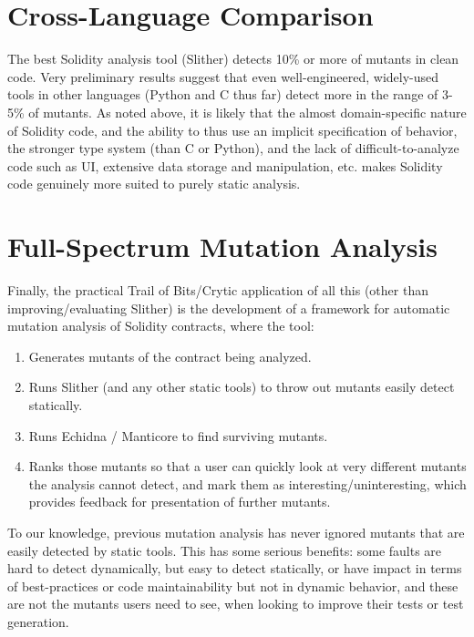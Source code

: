 \documentclass{article}
\begin{document}
\section{Cross-Language Comparison}

The best Solidity analysis tool (Slither) detects 10\% or more of mutants in clean code.   Very preliminary results suggest that even well-engineered, widely-used tools in other languages (Python and C thus far) detect more in the range of 3-5\% of mutants.  As noted above, it is likely that the almost domain-specific nature of Solidity code, and the ability to thus use an implicit specification of behavior, the stronger type system (than C or Python), and the lack of difficult-to-analyze code such as UI, extensive data storage and manipulation, etc. makes Solidity code genuinely more suited to purely static analysis. 

\section{Full-Spectrum Mutation Analysis}

Finally, the practical Trail of Bits/Crytic application of all this (other than improving/evaluating Slither) is the development of a framework for automatic mutation analysis of Solidity contracts, where the tool:

\begin{enumerate}
\item Generates mutants of the contract being analyzed.
\item Runs Slither (and any other static tools) to throw out mutants easily detect statically.
\item Runs Echidna / Manticore to find surviving mutants.
\item Ranks those mutants so that a user can quickly look at very different mutants the analysis cannot detect, and mark them as interesting/uninteresting, which provides feedback for presentation of further mutants.
\end{enumerate}

To our knowledge, previous mutation analysis has never ignored mutants that are easily detected by static tools.  This has some serious benefits:  some faults are hard to detect dynamically, but easy to detect statically, or have impact in terms of best-practices or code maintainability but not in dynamic behavior, and these are not the mutants users need to see, when looking to improve their tests or test generation.



\end{document}

